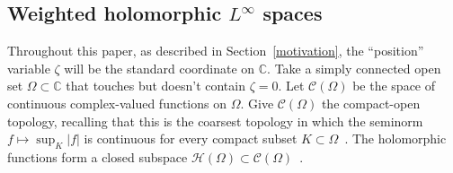 \documentclass{article}
\theoremstyle{plain}
\newcommand{\C}{\mathbb{C}}
\newcommand{\cont}{\mathcal{C}}
\newcommand{\holo}{\mathcal{H}}
\begin{document}
\subsection{Weighted holomorphic $L^{\infty}$ spaces}\label{sec:fn-space-defs}
Throughout this paper, as described in Section~\ref{motivation}, the ``position'' variable $\zeta$ will be the standard coordinate on $\C$. Take a simply connected open set $\Omega \subset \C$ that touches but doesn't contain $\zeta = 0$. Let $\cont(\Omega)$ be the space of continuous complex-valued functions on $\Omega$. Give $\cont(\Omega)$ the compact-open topology, recalling that this is the coarsest topology in which the seminorm $f \mapsto \sup_K |f|$ is continuous for every compact subset $K \subset \Omega$~\cite[Example~2.6 and \S 4 notes]{fnl-cpx-anal}. The holomorphic functions form a closed subspace $\holo(\Omega) \subset \cont(\Omega)$~\cite[Proposition~3.14]{fnl-cpx-anal}.
\end{document}
